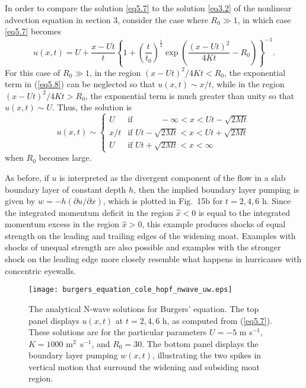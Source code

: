 \documentclass[10pt]{article}
\begin{document}
In order to compare the solution \eqref{eq5.7} to the solution
\eqref{eq3.2} of the nonlinear advection equation in section 3,
consider the case where $R_0 \gg 1$, in which case \eqref{eq5.7} becomes
\begin{equation}                                 %
     u(x,t) = U + \frac{x-Ut}{t}
       \left\{1 + \left(\frac{t}{t_0}\right)^{\frac{1}{2}}
       \exp\left(\frac{(x-Ut)^2}{4Kt} - R_0\right)\right\}^{-1}.
\label{eq5.8}
\end{equation}
For this case of $R_0 \gg 1$, in the region $(x-Ut)^2/4Kt < R_0$, the exponential
term in (\ref{eq5.8}) can be neglected so that $u(x,t) \sim x/t$, while in the
region $(x-Ut)^2/4Kt > R_0$, the exponential term is much greater than unity so
that $u(x,t) \sim U$. Thus, the solution is
\begin{equation}                                 %
     u(x,t) \sim \begin{cases}
                    U    & \text{if } \qquad\quad -\infty < x < Ut - \sqrt{2Mt} \\
                    x/t  & \text{if }     Ut - \sqrt{2Mt} < x < Ut + \sqrt{2Mt} \\
	            U    & \text{if }     Ut + \sqrt{2Mt} < x < \infty
                 \end{cases}
\label{eq5.9}
\end{equation}
when $R_0$ becomes large.

     As before, if $u$ is interpreted as the divergent component of the flow
in a slab boundary layer of constant depth $h$, then the implied boundary layer
pumping is given by $w=-h(\partial u/\partial x)$, which is plotted in Fig.~15b
for $t=2,4,6$ h. Since the integrated momentum deficit in the region $\hat{x}<0$ is
equal to the integrated momentum excess in the region $\hat{x}>0$, this
example produces shocks of equal strength on the leading and trailing edges
of the widening moat. Examples with shocks of unequal strength are also
possible and examples with the stronger shock on the leading edge more
closely resemble what happens in hurricanes with concentric eyewalls.


\begin{figure}[!t]             %
\centerline{\texttt{[image: burgers\_equation\_cole\_hopf\_nwave\_uw.eps]}}
\caption{The analytical N-wave solutions for Burgers' equation. The top panel
displays $u(x,t)$ at $t=2,4,6$ h, as computed from (\ref{eq5.7}). These
solutions are for the particular parameters $U=-5$ m s$^{-1}$, $K=1000$ m$^2$~s$^{-1}$,
and $R_0=30$. The bottom panel displays the boundary layer pumping $w(x,t)$, illustrating
the two spikes in vertical motion that surround the widening and subsiding moat region.}
\end{figure}
\end{document}
